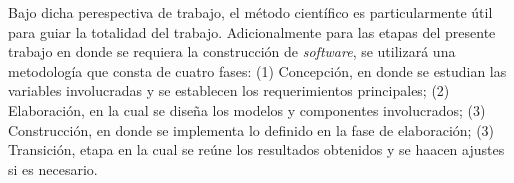 Bajo dicha perespectiva de trabajo, el método científico es particularmente útil para guiar la totalidad del trabajo.
Adicionalmente para las etapas del presente trabajo en donde se requiera la construcción de \textit{software}, se utilizará una metodología que consta de cuatro fases: (1) Concepción, en donde se estudian las variables involucradas y se establecen los requerimientos principales; (2) Elaboración, en la cual se diseña los modelos y componentes involucrados; (3) Construcción, en donde se implementa lo definido en la fase de elaboración; (3) Transición, etapa en la cual se reúne los resultados obtenidos y se haacen ajustes si es necesario.  






